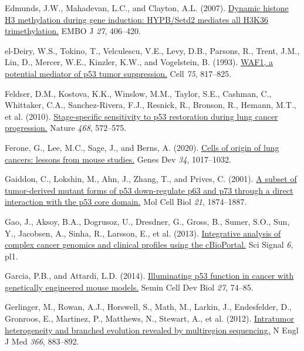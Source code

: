 \begin{CSLReferences}{0}{0}
\leavevmode{}%
Edmunds, J.W., Mahadevan, L.C., and Clayton, A.L. (2007). \href{https://doi.org/10.1038/sj.emboj.7601967}{Dynamic histone H3 methylation during gene induction: HYPB/Setd2 mediates all H3K36 trimethylation.} EMBO J \emph{27}, 406--420.

\leavevmode{}%
el-Deiry, W.S., Tokino, T., Velculescu, V.E., Levy, D.B., Parsons, R., Trent, J.M., Lin, D., Mercer, W.E., Kinzler, K.W., and Vogelstein, B. (1993). \href{https://doi.org/10.1016/0092-8674(93)90500-p}{WAF1, a potential mediator of p53 tumor suppression.} Cell \emph{75}, 817--825.

\leavevmode{}%
Feldser, D.M., Kostova, K.K., Winslow, M.M., Taylor, S.E., Cashman, C., Whittaker, C.A., Sanchez-Rivera, F.J., Resnick, R., Bronson, R., Hemann, M.T., et al. (2010). \href{https://doi.org/10.1038/nature09535}{Stage-specific sensitivity to p53 restoration during lung cancer progression.} Nature \emph{468}, 572--575.

\leavevmode{}%
Ferone, G., Lee, M.C., Sage, J., and Berns, A. (2020). \href{https://doi.org/10.1101/gad.338228.120}{Cells of origin of lung cancers: lessons from mouse studies.} Genes Dev \emph{34}, 1017--1032.

\leavevmode{}%
Gaiddon, C., Lokshin, M., Ahn, J., Zhang, T., and Prives, C. (2001). \href{https://doi.org/10.1128/mcb.21.5.1874-1887.2001}{A subset of tumor-derived mutant forms of p53 down-regulate p63 and p73 through a direct interaction with the p53 core domain.} Mol Cell Biol \emph{21}, 1874--1887.

\leavevmode{}%
Gao, J., Aksoy, B.A., Dogrusoz, U., Dresdner, G., Gross, B., Sumer, S.O., Sun, Y., Jacobsen, A., Sinha, R., Larsson, E., et al. (2013). \href{https://doi.org/10.1126/scisignal.2004088}{Integrative analysis of complex cancer genomics and clinical profiles using the cBioPortal.} Sci Signal \emph{6}, pl1.

\leavevmode{}%
Garcia, P.B., and Attardi, L.D. (2014). \href{https://doi.org/10.1016/j.semcdb.2013.12.014}{Illuminating p53 function in cancer with genetically engineered mouse models.} Semin Cell Dev Biol \emph{27}, 74--85.

\leavevmode{}%
Gerlinger, M., Rowan, A.J., Horswell, S., Math, M., Larkin, J., Endesfelder, D., Gronroos, E., Martinez, P., Matthews, N., Stewart, A., et al. (2012). \href{https://doi.org/10.1056/nejmoa1113205}{Intratumor heterogeneity and branched evolution revealed by multiregion sequencing.} N Engl J Med \emph{366}, 883--892.


\end{CSLReferences}

